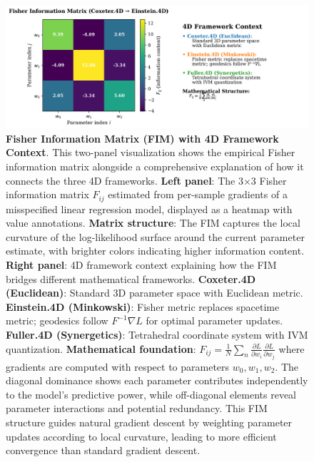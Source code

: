 \documentclass[
  10pt,
]{article}
\begin{document}
\begin{figure}
\centering
\includegraphics{../output/figures/fisher_information_matrix.png}
\caption{\textbf{Fisher Information Matrix (FIM) with 4D Framework
Context}. This two-panel visualization shows the empirical Fisher
information matrix alongside a comprehensive explanation of how it
connects the three 4D frameworks. \textbf{Left panel}: The 3×3 Fisher
information matrix \(F_{ij}\) estimated from per-sample gradients of a
misspecified linear regression model, displayed as a heatmap with value
annotations. \textbf{Matrix structure}: The FIM captures the local
curvature of the log-likelihood surface around the current parameter
estimate, with brighter colors indicating higher information content.
\textbf{Right panel}: 4D framework context explaining how the FIM
bridges different mathematical frameworks. \textbf{Coxeter.4D
(Euclidean)}: Standard 3D parameter space with Euclidean metric.
\textbf{Einstein.4D (Minkowski)}: Fisher metric replaces spacetime
metric; geodesics follow \(F^{-1}\nabla L\) for optimal parameter
updates. \textbf{Fuller.4D (Synergetics)}: Tetrahedral coordinate system
with IVM quantization. \textbf{Mathematical foundation}:
\(F_{ij} = \frac{1}{N}\sum_n \frac{\partial L}{\partial w_i} \frac{\partial L}{\partial w_j}\)
where gradients are computed with respect to parameters
\(w_0, w_1, w_2\). The diagonal dominance shows each parameter
contributes independently to the model's predictive power, while
off-diagonal elements reveal parameter interactions and potential
redundancy. This FIM structure guides natural gradient descent by
weighting parameter updates according to local curvature, leading to
more efficient convergence than standard gradient descent.}
\end{figure}
\end{document}
